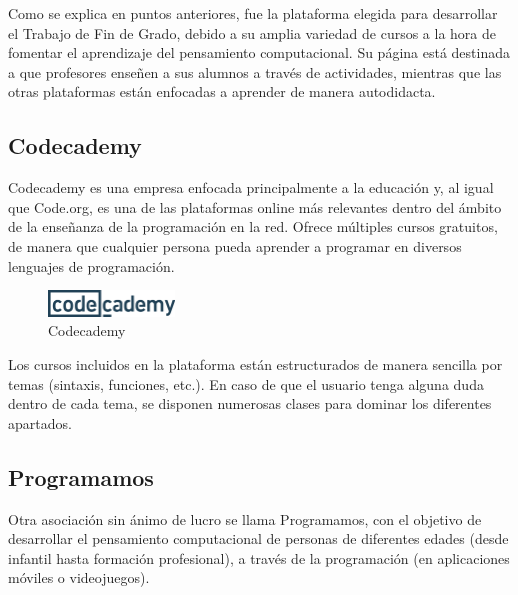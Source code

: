 Como se explica en puntos anteriores, fue la plataforma elegida para desarrollar el Trabajo de Fin de Grado, debido a su amplia variedad de cursos a la hora de fomentar el aprendizaje del pensamiento computacional. Su página está destinada a que profesores
enseñen a sus alumnos a través de actividades, mientras que las otras plataformas están enfocadas a aprender de manera autodidacta.


\subsection{Codecademy}
\label{2:sec:3}

Codecademy es una empresa enfocada principalmente a la educación y, al igual que Code.org, es una de las plataformas online más relevantes dentro del ámbito de la enseñanza de la programación en la red. Ofrece múltiples cursos gratuitos, de manera que cualquier
persona pueda aprender a programar en diversos lenguajes de programación.

\begin{figure}[!th]
\begin{center}
\includegraphics[width=0.3\textwidth]{images/captura_codecademy.eps}
\caption{Codecademy}
\label{fig:2}
\end{center}
\end{figure}

Los cursos incluidos en la plataforma están estructurados de manera sencilla por temas (sintaxis, funciones, etc.). En caso de que el usuario tenga alguna duda dentro de cada tema, se disponen numerosas clases para dominar los diferentes apartados.


\subsection{Programamos}
\label{2:sec:4}

Otra asociación sin ánimo de lucro se llama Programamos, con el objetivo de desarrollar el pensamiento computacional de personas de diferentes edades (desde infantil hasta formación profesional), a través de la programación (en aplicaciones móviles o videojuegos).

